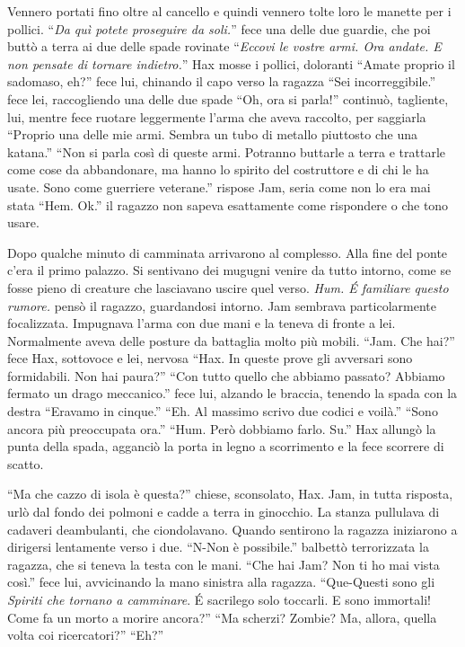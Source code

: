     Vennero portati fino oltre al cancello e quindi vennero tolte loro le
    manette per i pollici. ``\emph{Da quì potete proseguire da soli.}'' fece una delle
    due guardie, che poi buttò a terra ai due delle spade rovinate ``\emph{Eccovi le
    vostre armi. Ora andate. E non pensate di tornare indietro.}'' Hax
    mosse i pollici, doloranti ``Amate proprio il sadomaso, eh?'' fece lui,
    chinando il capo verso la ragazza ``Sei incorreggibile.'' fece lei,
    raccogliendo una delle due spade ``Oh, ora si parla!'' continuò,
    tagliente, lui, mentre fece ruotare leggermente l'arma che aveva
    raccolto, per saggiarla ``Proprio una delle mie armi. Sembra un tubo di
    metallo piuttosto che una katana.'' ``Non si parla così di queste armi.
    Potranno buttarle a terra e trattarle come cose da abbandonare, ma
    hanno lo spirito del costruttore e di chi le ha usate. Sono come
    guerriere veterane.'' rispose Jam, seria come non lo era mai stata
    ``Hem. Ok.'' il ragazzo non sapeva esattamente come rispondere o che
    tono usare.

    Dopo qualche minuto di camminata arrivarono al complesso. Alla fine del
    ponte c'era il primo palazzo. Si sentivano dei mugugni venire da tutto
    intorno, come se fosse pieno di creature che lasciavano uscire quel
    verso. \emph{Hum. \'E familiare questo rumore.} pensò il ragazzo,
    guardandosi intorno. Jam sembrava particolarmente focalizzata.
    Impugnava l'arma con due mani e la teneva di fronte a lei. Normalmente
    aveva delle posture da battaglia molto più mobili. ``Jam. Che hai?''
    fece Hax, sottovoce e lei, nervosa ``Hax. In queste prove gli avversari
    sono formidabili. Non hai paura?'' ``Con tutto quello che abbiamo
    passato? Abbiamo fermato un drago meccanico.'' fece lui, alzando le
    braccia, tenendo la spada con la destra ``Eravamo in cinque.'' ``Eh. Al
    massimo scrivo due codici e voilà.'' ``Sono ancora più preoccupata
    ora.'' ``Hum. Però dobbiamo farlo. Su.'' Hax allungò la punta della
    spada, agganciò la porta in legno a scorrimento e la fece scorrere di
    scatto.

    ``Ma che cazzo di isola è questa?'' chiese, sconsolato, Hax. Jam, in
    tutta risposta, urlò dal fondo dei polmoni e cadde a terra in
    ginocchio. La stanza pullulava di cadaveri deambulanti, che
    ciondolavano. Quando sentirono la ragazza iniziarono a dirigersi
    lentamente verso i due. ``N-Non è possibile.'' balbettò terrorizzata la
    ragazza, che si teneva la testa con le mani. ``Che hai Jam? Non ti ho
    mai vista così.'' fece lui, avvicinando la mano sinistra alla ragazza.
    ``Que-Questi sono gli \emph{Spiriti che tornano a camminare}. \'E
    sacrilego solo toccarli. E sono immortali! Come fa un morto a morire
    ancora?'' ``Ma scherzi? Zombie? Ma, allora, quella volta coi
    ricercatori?'' ``Eh?''

